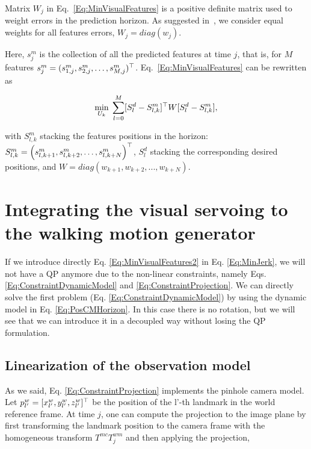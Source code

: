 Matrix $W_j$ in Eq.~\ref{Eq:MinVisualFeatures} is a positive definite matrix  used to weight errors in the prediction horizon. As suggested in~\cite{Allibert2010}, we   consider equal weights for all features errors, $W_j = diag(w_j)$. 

Here, $s^m_j$ is the collection of all the predicted features at time $j$, that is, for $M$ features $s^m_j = ( s_{1,j}^m, s_{2,j}^m, \hdots, s_{M,j}^m )^{\top} $. Eq.~\ref{Eq:MinVisualFeatures} can be rewritten as

\begin{equation}
\label{Eq:MinVisualFeatures2}
 \min_{U_{k}} \; \sum\limits_{l=0}^{M}  [S^d_{l} - S^m_{l,k}]^{\top} W [S^d_{l} - S^m_{l,k}],
\end{equation}

with $S^m_{l,k}$ stacking the features positions in the horizon: $S^m_{l,k} =  \left(
  s^m_{l,k+1},
  s^m_{l,k+2},
 \dots,
  s^m_{l,k+N}
 \right)^{\top}$, $S^d_{l}$ stacking the corresponding desired positions, and $W = diag(w_{k+1},w_{k+2},...,w_{k+N})$.

\section{Integrating the visual servoing to the walking motion generator}
\label{sec:integration}
If we introduce directly Eq. \ref{Eq:MinVisualFeatures2} in Eq. \ref{Eq:MinJerk}, we will not have a QP anymore due to the non-linear constraints, namely Eqs. \ref{Eq:ConstraintDynamicModel} and \ref{Eq:ConstraintProjection}. We can directly solve the first problem (Eq. \ref{Eq:ConstraintDynamicModel}) by using the dynamic model in Eq. \ref{Eq:PosCMHorizon}. In this case there is no rotation, but we will see that we can introduce it in a decoupled way without losing the QP formulation.

\subsection{Linearization of the observation model}

As we said, Eq. \ref{Eq:ConstraintProjection} implements the pinhole camera model. Let $p^{w}_{l'} = [x^{w}_{l'},y^{w}_{l'},z^{w}_{l'}]^{\top}$ be the position of the {l'}-th landmark in the world reference frame. At time $j$, one can compute the projection to the image plane by first transforming the landmark position to the camera frame with the homogeneous transform $T^{mc} T^{wm}_j$ and then applying the projection,

